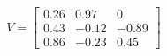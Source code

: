 \documentclass[preview]{standalone}
\begin{document}
\begin{align*}
V=\left[\begin{matrix}0.26&0.97&0\\0.43&-0.12&-0.89\\0.86&-0.23&0.45\end{matrix}\right]
\end{align*}
\end{document}
